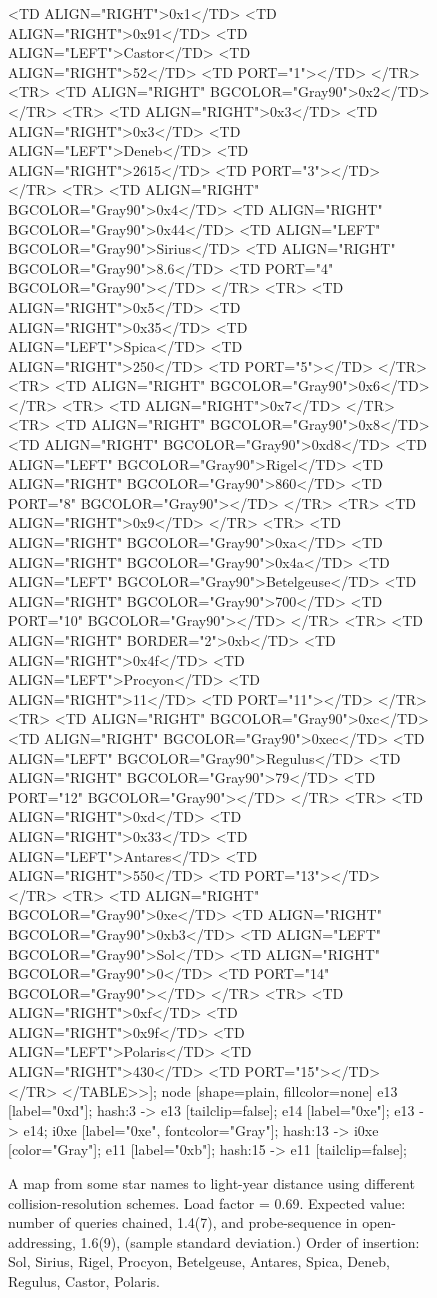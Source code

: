 \documentclass[12pt]{article}
\begin{document}
\begin{figure}
{{		<TD ALIGN="RIGHT">0x1</TD>
		<TD ALIGN="RIGHT">0x91</TD>
		<TD ALIGN="LEFT">Castor</TD>
		<TD ALIGN="RIGHT">52</TD>
		<TD PORT="1">
	</TR>
	<TR>
		<TD ALIGN="RIGHT" BGCOLOR="Gray90">0x2</TD>
	</TR>
	<TR>
		<TD ALIGN="RIGHT">0x3</TD>
		<TD ALIGN="RIGHT">0x3</TD>
		<TD ALIGN="LEFT">Deneb</TD>
		<TD ALIGN="RIGHT">2615</TD>
		<TD PORT="3">
	</TR>
	<TR>
		<TD ALIGN="RIGHT" BGCOLOR="Gray90">0x4</TD>
		<TD ALIGN="RIGHT" BGCOLOR="Gray90">0x44</TD>
		<TD ALIGN="LEFT" BGCOLOR="Gray90">Sirius</TD>
		<TD ALIGN="RIGHT" BGCOLOR="Gray90">8.6</TD>
		<TD PORT="4" BGCOLOR="Gray90">
	</TR>
	<TR>
		<TD ALIGN="RIGHT">0x5</TD>
		<TD ALIGN="RIGHT">0x35</TD>
		<TD ALIGN="LEFT">Spica</TD>
		<TD ALIGN="RIGHT">250</TD>
		<TD PORT="5">
	</TR>
	<TR>
		<TD ALIGN="RIGHT" BGCOLOR="Gray90">0x6</TD>
	</TR>
	<TR>
		<TD ALIGN="RIGHT">0x7</TD>
	</TR>
	<TR>
		<TD ALIGN="RIGHT" BGCOLOR="Gray90">0x8</TD>
		<TD ALIGN="RIGHT" BGCOLOR="Gray90">0xd8</TD>
		<TD ALIGN="LEFT" BGCOLOR="Gray90">Rigel</TD>
		<TD ALIGN="RIGHT" BGCOLOR="Gray90">860</TD>
		<TD PORT="8" BGCOLOR="Gray90">
	</TR>
	<TR>
		<TD ALIGN="RIGHT">0x9</TD>
	</TR>
	<TR>
		<TD ALIGN="RIGHT" BGCOLOR="Gray90">0xa</TD>
		<TD ALIGN="RIGHT" BGCOLOR="Gray90">0x4a</TD>
		<TD ALIGN="LEFT" BGCOLOR="Gray90">Betelgeuse</TD>
		<TD ALIGN="RIGHT" BGCOLOR="Gray90">700</TD>
		<TD PORT="10" BGCOLOR="Gray90">
	</TR>
	<TR>
		<TD ALIGN="RIGHT" BORDER="2">0xb</TD>
		<TD ALIGN="RIGHT">0x4f</TD>
		<TD ALIGN="LEFT">Procyon</TD>
		<TD ALIGN="RIGHT">11</TD>
		<TD PORT="11">
	</TR>
	<TR>
		<TD ALIGN="RIGHT" BGCOLOR="Gray90">0xc</TD>
		<TD ALIGN="RIGHT" BGCOLOR="Gray90">0xec</TD>
		<TD ALIGN="LEFT" BGCOLOR="Gray90">Regulus</TD>
		<TD ALIGN="RIGHT" BGCOLOR="Gray90">79</TD>
		<TD PORT="12" BGCOLOR="Gray90">
	</TR>
	<TR>
		<TD ALIGN="RIGHT">0xd</TD>
		<TD ALIGN="RIGHT">0x33</TD>
		<TD ALIGN="LEFT">Antares</TD>
		<TD ALIGN="RIGHT">550</TD>
		<TD PORT="13">
	</TR>
	<TR>
		<TD ALIGN="RIGHT" BGCOLOR="Gray90">0xe</TD>
		<TD ALIGN="RIGHT" BGCOLOR="Gray90">0xb3</TD>
		<TD ALIGN="LEFT" BGCOLOR="Gray90">Sol</TD>
		<TD ALIGN="RIGHT" BGCOLOR="Gray90">0</TD>
		<TD PORT="14" BGCOLOR="Gray90">
	</TR>
	<TR>
		<TD ALIGN="RIGHT">0xf</TD>
		<TD ALIGN="RIGHT">0x9f</TD>
		<TD ALIGN="LEFT">Polaris</TD>
		<TD ALIGN="RIGHT">430</TD>
		<TD PORT="15">
	</TR>
</TABLE>>];
	node [shape=plain, fillcolor=none]
	e13 [label="0xd"];
	hash:3 -> e13 [tailclip=false];
	e14 [label="0xe"];
	e13 -> e14;
	i0xe [label="0xe", fontcolor="Gray"];
	hash:13 -> i0xe [color="Gray"];
	e11 [label="0xb"];
	hash:15 -> e11 [tailclip=false];
		}
	}
	\caption{A map from some star names to light-year distance using different collision-resolution schemes. Load factor  = 0.69. Expected value: number of queries chained, 1.4(7),
and probe-sequence in open-addressing, 1.6(9),
(sample standard deviation.)\label{types}
Order of insertion: Sol, Sirius, Rigel, Procyon, Betelgeuse, Antares, Spica, Deneb, Regulus, Castor, Polaris.}
\end{figure}
\end{document}
